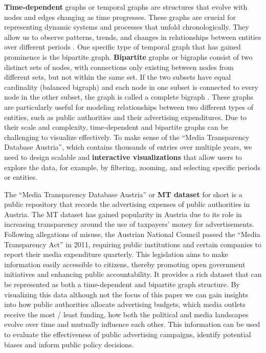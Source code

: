 \documentclass{vgtc}
\begin{document}
\textbf{Time-dependent} graphs or temporal graphs are structures that evolve with nodes and edges changing as time progresses. These graphs are crucial for representing dynamic systems and processes that unfold chronologically. They allow us to observe patterns, trends, and changes in relationships between entities over different periods \cite{Waldner2020InteractiveEO}.
One specific type of temporal graph that has gained prominence is the bipartite graph. \textbf{Bipartite} graphs or bigraphs consist of two distinct sets of nodes, with connections only existing between nodes from different sets, but not within the same set. If the two subsets have equal cardinality (balanced bigraph) and each node in one subset is connected to every node in the other subset, the graph is called a complete bigraph \cite{diestel2012graph}. These graphs are particularly useful for modeling relationships between two different types of entities, such as public authorities and their advertising expenditures.
Due to their scale and complexity, time-dependent and bipartite graphs can be challenging to visualize effectively. To make sense of the ``Media Transparency Database Austria'', which contains thousands of entries over multiple years, we need to design scalable and \textbf{interactive visualizations} that allow users to explore the data, for example, by filtering, zooming, and selecting specific periods or entities.

The ``Media Transparency Database Austria'' \cite{dataset} or \textbf{MT dataset} for short is a public repository that records the advertising expenses of public authorities in Austria. The MT dataset has gained popularity in Austria due to its role in increasing transparency around the use of taxpayers' money for advertisements. Following allegations of misuse, the Austrian National Council passed the ``Media Transparency Act'' in 2011, requiring public institutions and certain companies to report their media expenditure quarterly. This legislation aims to make information easily accessible to citizens, thereby promoting open government initiatives and enhancing public accountability.
It provides a rich dataset that can be represented as both a time-dependent and bipartite graph structure. By visualizing this data \textendash{} although not the focus of this paper \textendash{} we can gain insights into how public authorities allocate advertising budgets, which media outlets receive the most / least funding, how both the political and media landscapes evolve over time and mutually influence each other. This information can be used to evaluate the effectiveness of public advertising campaigns, identify potential biases and inform public policy decisions.
\end{document}
